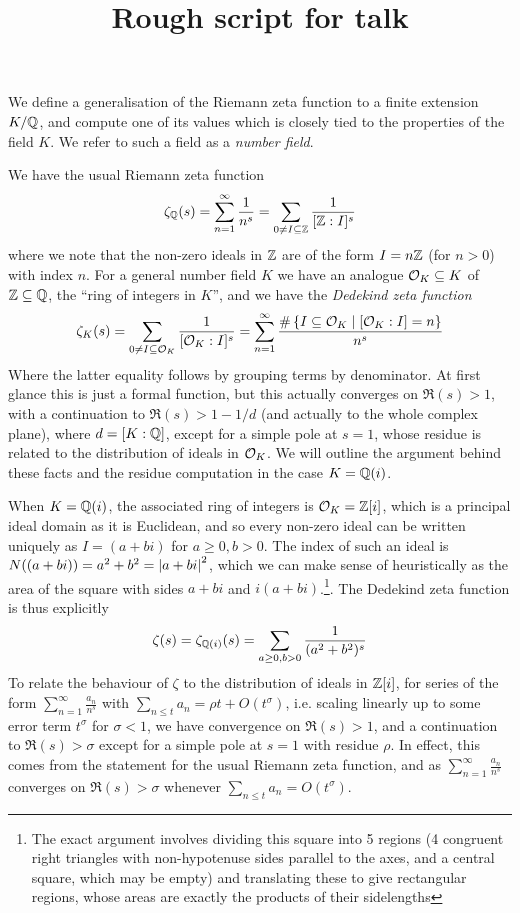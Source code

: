 \documentclass[11pt]{article}
\title{Rough script for talk}
\begin{document}
\maketitle
We define a generalisation of the Riemann zeta function to a finite extension $K / \mathbb{Q}$, and compute one of its values which is closely tied to the properties of the field $K$. We refer to such a field as a \emph{number field}.

We have the usual Riemann zeta function
$$
    \zeta_{\mathbb{Q}}(s) = \sum_{n = 1}^\infty \frac1{n^s} = \sum_{0 \neq I \subseteq \mathbb{Z}}\frac1{[\mathbb{Z} : I]^s}
$$
where we note that the non-zero ideals in $\mathbb{Z}$ are of the form $I = n\mathbb{Z}$ (for $n > 0$) with index $n$. For a general number field $K$ we have an analogue $\mathcal{O}_K \subseteq K$ of $\mathbb{Z} \subseteq \mathbb{Q}$, the ``ring of integers in $K$'', and we have the \emph{Dedekind zeta function} 
\begin{align}\label{dzf}
    \zeta_K(s) = \sum_{0 \neq I \subseteq \mathcal{O}_K}\frac1{[\mathcal{O}_K : I]^s} = \sum_{n = 1}^\infty \frac{\# \left\{  I \subseteq \mathcal{O}_K \mid [\mathcal{O}_K : I] = n  \right\}}{n^s}
\end{align}
Where the latter equality follows by grouping terms by denominator. At first glance this is just a formal function, but this actually converges on $\Re(s) > 1$, with a continuation to $\Re(s) > 1 - 1/d$ (and actually to the whole complex plane), where $d = [K : \mathbb{Q}]$, except for a simple pole at $s = 1$, whose residue is related to the distribution of ideals in $\mathcal{O}_K$. We will outline the argument behind these facts and the residue computation in the case $K = \mathbb{Q}(i)$.

When $K = \mathbb{Q}(i)$, the associated ring of integers is $\mathcal{O}_K = \mathbb{Z}[i]$, which is a principal ideal domain as it is Euclidean, and so every non-zero ideal can be written uniquely as $I = (a + bi)$ for $a \geq 0, b > 0$. The index of such an ideal is $N((a + bi)) = a^2 + b^2 = \left| a + bi \right|^2$, which we can make sense of heuristically as the area of the square with sides $a + bi$ and $i(a + bi)$.\footnote{The exact argument involves dividing this square into 5 regions (4 congruent right triangles with non-hypotenuse sides parallel to the axes, and a central square, which may be empty) and translating these to give rectangular regions, whose areas are exactly the products of their sidelengths}. The Dedekind zeta function is thus explicitly
$$
    \zeta(s) = \zeta_{\mathbb{Q}(i)}(s) = \sum_{a \geq 0, b > 0} \frac1{(a^2 + b^2)^s}
$$
To relate the behaviour of $\zeta$ to the distribution of ideals in $\mathbb{Z}[i]$, for series of the form $\sum_{n = 1}^\infty \frac{a_n}{n^s}$ with $\sum_{n \leq t} a_n = \rho t + O(t^\sigma)$, i.e. scaling linearly up to some error term $t^\sigma$ for $\sigma < 1$, we have convergence on $\Re(s) > 1$, and a continuation to $\Re(s) > \sigma$ except for a simple pole at $s = 1$ with residue $\rho$. In effect, this comes from the statement for the usual Riemann zeta function, and as $\sum_{n = 1}^\infty \frac{a_n}{n^s}$ converges on $\Re(s) > \sigma$ whenever $\sum_{n \leq t} a_n = O(t^\sigma)$.
\end{document}

